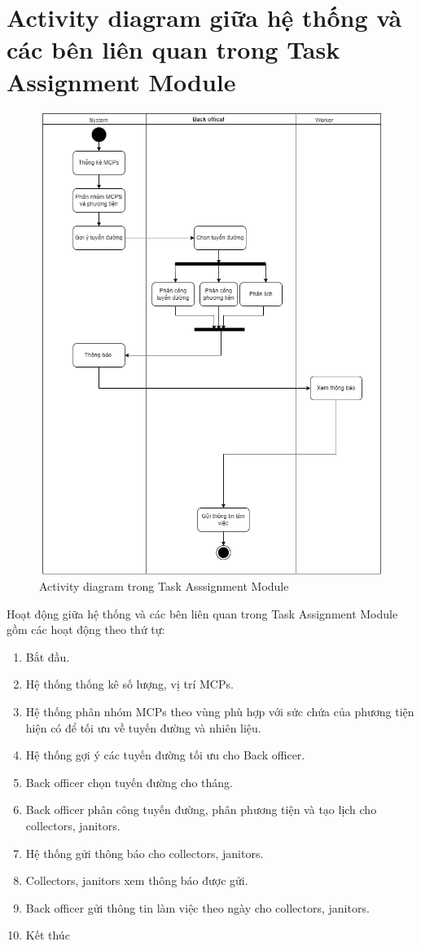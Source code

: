 
\section{Activity diagram giữa hệ thống và các bên liên quan trong Task Assignment Module}
    \begin{figure}[h]
        \centering
        \includegraphics[width=15.0cm,height=15cm]{imgs/activity diagram/activity diagram.jpg}
        \caption{Activity diagram trong Task Asssignment Module}
    \end{figure}
    \newpage
    Hoạt động giữa hệ thống và các bên liên quan trong Task Assignment Module gồm các hoạt động theo thứ tự:
    \begin{enumerate}
        \item Bắt đầu.
        \item Hệ thống thống kê số lượng, vị trí MCPs.
        \item Hệ thống phân nhóm MCPs theo vùng phù hợp với sức chứa của phương tiện hiện có để tối ưu về tuyến đường và nhiên liệu.
        \item Hệ thống gợi ý các tuyến đường tối ưu cho Back officer.
        \item Back officer chọn tuyến đường cho tháng.
        \item Back officer phân công tuyến đường, phân phương tiện và tạo lịch cho collectors, janitors.
        \item Hệ thống gửi thông báo cho collectors, janitors.
        \item  Collectors, janitors xem thông báo được gửi.
        \item Back officer gửi thông tin làm việc theo ngày cho collectors, janitors.
        \item Kết thúc
    \end{enumerate}
